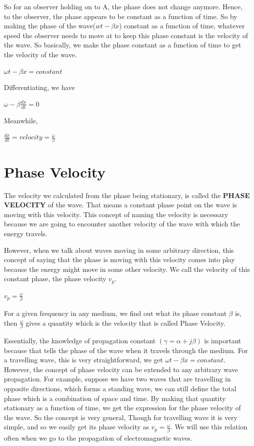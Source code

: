 So for an observer holding on to A, the phase does not change anymore. Hence, to the observer, the phase appears to be constant as a function of time. So by making the phase of the wave($wt - \beta x$) constant as a function of time, whatever speed the observer needs to move at to keep this phase constant is the velocity of the wave. So basically, we make the phase constant as a function of time to get the velocity of the wave.
\begin{center}
$\omega t-\beta x = constant$
\end{center}

Differentiating, we have
\begin{center}
$\omega-\beta\frac{dx}{dt}=0$
\end{center}

Meanwhile, 
\begin{center}
$\frac{dx}{dt}=velocity=\frac{\omega}{\beta}$
\end{center}

\section{\textbf{Phase Velocity}}
The velocity we calculated from the phase being stationary, is called the \textbf{PHASE VELOCITY} of the wave. That means a constant phase point on the wave is moving with this velocity. This concept of naming the velocity is necessary because we are going to encounter another velocity of the wave with which the energy travels.

However, when we talk about waves moving in some arbitrary direction, this concept of saying that the phase is moving with this velocity comes into play because the energy might move in some other velocity. We call the velocity of this constant phase, the phase velocity $ v_p $.

\begin{center}
$ v_p=\frac{\omega}{\beta} $
\end{center}

For a given frequency in any medium, we find out what its phase constant $\beta  $ is, then $\frac{\omega}{\beta}$ gives a quantity which is the velocity that is called Phase Velocity.

Essentially, the knowledge of propagation constant $(\gamma=\alpha+j\beta)$ is important because that tells the phase of the wave when it travels through the medium.
For a travelling wave, this is very straightforward, we get $ \omega t-\beta x=constant $. However, the concept of phase velocity can be extended to any arbitrary wave propagation. For example, suppose we have two waves that are travelling in opposite directions, which forms a standing wave, we can still define the total phase which is a combination of space and time. By making that quantity stationary as a function of time, we get the expression for the phase velocity of the wave. So the concept is very general, Though for travelling wave it is very simple, and so we easily get its phase velocity as $v_{p} = \frac{\omega}{\beta}.$ We will use this relation often when we go to the propagation of electromagnetic waves.

